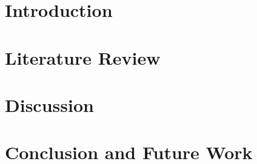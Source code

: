 \documentclass[12pt]{article}
\begin{document}


\newpage


\newpage


\newpage


\newpage


\newpage
\tableofcontents

\newpage
\listoffigures

\newpage
\listoftables

\newpage

\section{Introduction}


\newpage

\section{Literature Review}



% 


% 
% 
% 
% 
% 
% 
% 


% 

\newpage

\section{Discussion}


\newpage

\section{Conclusion and Future Work}


\newpage
\nocite{*} %


\end{document}
